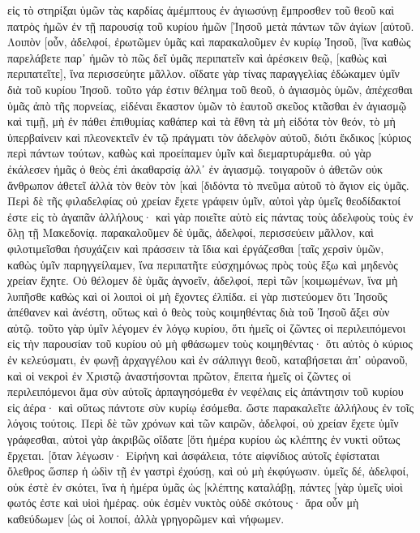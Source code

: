 εἰς τὸ στηρίξαι ὑμῶν τὰς καρδίας ἀμέμπτους ἐν ἁγιωσύνῃ ἔμπροσθεν τοῦ θεοῦ καὶ πατρὸς ἡμῶν ἐν τῇ παρουσίᾳ τοῦ κυρίου ἡμῶν [Ἰησοῦ μετὰ πάντων τῶν ἁγίων [αὐτοῦ. 
Λοιπὸν [οὖν, ἀδελφοί, ἐρωτῶμεν ὑμᾶς καὶ παρακαλοῦμεν ἐν κυρίῳ Ἰησοῦ, [ἵνα καθὼς παρελάβετε παρ᾽ ἡμῶν τὸ πῶς δεῖ ὑμᾶς περιπατεῖν καὶ ἀρέσκειν θεῷ, [καθὼς καὶ περιπατεῖτε], ἵνα περισσεύητε μᾶλλον. 
οἴδατε γὰρ τίνας παραγγελίας ἐδώκαμεν ὑμῖν διὰ τοῦ κυρίου Ἰησοῦ. 
τοῦτο γάρ ἐστιν θέλημα τοῦ θεοῦ, ὁ ἁγιασμὸς ὑμῶν, ἀπέχεσθαι ὑμᾶς ἀπὸ τῆς πορνείας, 
εἰδέναι ἕκαστον ὑμῶν τὸ ἑαυτοῦ σκεῦος κτᾶσθαι ἐν ἁγιασμῷ καὶ τιμῇ, 
μὴ ἐν πάθει ἐπιθυμίας καθάπερ καὶ τὰ ἔθνη τὰ μὴ εἰδότα τὸν θεόν, 
τὸ μὴ ὑπερβαίνειν καὶ πλεονεκτεῖν ἐν τῷ πράγματι τὸν ἀδελφὸν αὐτοῦ, διότι ἔκδικος [κύριος περὶ πάντων τούτων, καθὼς καὶ προείπαμεν ὑμῖν καὶ διεμαρτυράμεθα. 
οὐ γὰρ ἐκάλεσεν ἡμᾶς ὁ θεὸς ἐπὶ ἀκαθαρσίᾳ ἀλλ᾽ ἐν ἁγιασμῷ. 
τοιγαροῦν ὁ ἀθετῶν οὐκ ἄνθρωπον ἀθετεῖ ἀλλὰ τὸν θεὸν τὸν [καὶ [διδόντα τὸ πνεῦμα αὐτοῦ τὸ ἅγιον εἰς ὑμᾶς. 
Περὶ δὲ τῆς φιλαδελφίας οὐ χρείαν ἔχετε γράφειν ὑμῖν, αὐτοὶ γὰρ ὑμεῖς θεοδίδακτοί ἐστε εἰς τὸ ἀγαπᾶν ἀλλήλους· 
καὶ γὰρ ποιεῖτε αὐτὸ εἰς πάντας τοὺς ἀδελφοὺς τοὺς ἐν ὅλῃ τῇ Μακεδονίᾳ. παρακαλοῦμεν δὲ ὑμᾶς, ἀδελφοί, περισσεύειν μᾶλλον, 
καὶ φιλοτιμεῖσθαι ἡσυχάζειν καὶ πράσσειν τὰ ἴδια καὶ ἐργάζεσθαι [ταῖς χερσὶν ὑμῶν, καθὼς ὑμῖν παρηγγείλαμεν, 
ἵνα περιπατῆτε εὐσχημόνως πρὸς τοὺς ἔξω καὶ μηδενὸς χρείαν ἔχητε. 
Οὐ θέλομεν δὲ ὑμᾶς ἀγνοεῖν, ἀδελφοί, περὶ τῶν [κοιμωμένων, ἵνα μὴ λυπῆσθε καθὼς καὶ οἱ λοιποὶ οἱ μὴ ἔχοντες ἐλπίδα. 
εἰ γὰρ πιστεύομεν ὅτι Ἰησοῦς ἀπέθανεν καὶ ἀνέστη, οὕτως καὶ ὁ θεὸς τοὺς κοιμηθέντας διὰ τοῦ Ἰησοῦ ἄξει σὺν αὐτῷ. 
τοῦτο γὰρ ὑμῖν λέγομεν ἐν λόγῳ κυρίου, ὅτι ἡμεῖς οἱ ζῶντες οἱ περιλειπόμενοι εἰς τὴν παρουσίαν τοῦ κυρίου οὐ μὴ φθάσωμεν τοὺς κοιμηθέντας· 
ὅτι αὐτὸς ὁ κύριος ἐν κελεύσματι, ἐν φωνῇ ἀρχαγγέλου καὶ ἐν σάλπιγγι θεοῦ, καταβήσεται ἀπ᾽ οὐρανοῦ, καὶ οἱ νεκροὶ ἐν Χριστῷ ἀναστήσονται πρῶτον, 
ἔπειτα ἡμεῖς οἱ ζῶντες οἱ περιλειπόμενοι ἅμα σὺν αὐτοῖς ἁρπαγησόμεθα ἐν νεφέλαις εἰς ἀπάντησιν τοῦ κυρίου εἰς ἀέρα· καὶ οὕτως πάντοτε σὺν κυρίῳ ἐσόμεθα. 
ὥστε παρακαλεῖτε ἀλλήλους ἐν τοῖς λόγοις τούτοις. 
Περὶ δὲ τῶν χρόνων καὶ τῶν καιρῶν, ἀδελφοί, οὐ χρείαν ἔχετε ὑμῖν γράφεσθαι, 
αὐτοὶ γὰρ ἀκριβῶς οἴδατε [ὅτι ἡμέρα κυρίου ὡς κλέπτης ἐν νυκτὶ οὕτως ἔρχεται. 
[ὅταν λέγωσιν· Εἰρήνη καὶ ἀσφάλεια, τότε αἰφνίδιος αὐτοῖς ἐφίσταται ὄλεθρος ὥσπερ ἡ ὠδὶν τῇ ἐν γαστρὶ ἐχούσῃ, καὶ οὐ μὴ ἐκφύγωσιν. 
ὑμεῖς δέ, ἀδελφοί, οὐκ ἐστὲ ἐν σκότει, ἵνα ἡ ἡμέρα ὑμᾶς ὡς [κλέπτης καταλάβῃ, 
πάντες [γὰρ ὑμεῖς υἱοὶ φωτός ἐστε καὶ υἱοὶ ἡμέρας. οὐκ ἐσμὲν νυκτὸς οὐδὲ σκότους· 
ἄρα οὖν μὴ καθεύδωμεν [ὡς οἱ λοιποί, ἀλλὰ γρηγορῶμεν καὶ νήφωμεν. 

